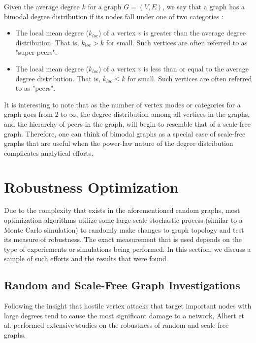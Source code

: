 \documentclass[11pt]{article}
\begin{document}
Given the average degree $k$ for a graph $G = (V,E)$, we say that a graph has a bimodal degree distribution if its nodes fall under one of two categories \cite{bimodal}:
\begin{itemize}
	\item The local mean degree ($k_{loc}$) of a vertex $v$ is greater than the average degree distribution. That is, $k_{loc} > k$ for small. Such vertices are often referred to as "super-peers".
	\item The local mean degree ($k_{loc}$) of a vertex $v$ is less than or equal to the average degree distribution. That is, $k_{loc} \leq k$ for small. Such vertices are often referred to as "peers".
\end{itemize}
It is interesting to note that as the number of vertex modes or categories for a graph goes from $2$ to $\infty$, the degree distribution among all vertices in the graphs, and the hierarchy of peers in the graph, will begin to resemble that of a scale-free graph. Therefore, one can think of bimodal graphs as a special case of scale-free graphs that are useful when the power-law nature of the degree distribution complicates analytical efforts.

\section{Robustness Optimization}

Due to the complexity that exists in the aforementioned random graphs, most optimization algorithms utilize some large-scale stochastic process (similar to a Monte Carlo simulation) to randomly make changes to graph topology and test its measure of robustness. The exact measurement that is used depends on the type of experiements or simulations being performed. In this section, we discuss a sample of such efforts and the results that were found.

\subsection{Random and Scale-Free Graph Investigations}


Following the insight that hostile vertex attacks that target important nodes with large degrees tend to cause the most significant damage to a network, Albert et al. performed extensive studies on the robustness of random and scale-free graphs. 
\end{document}
